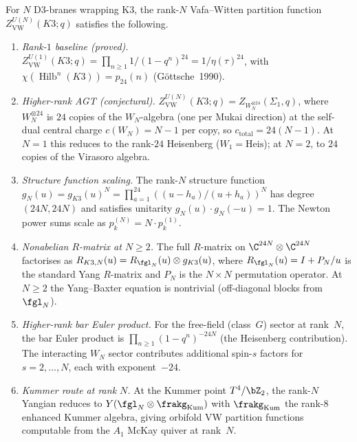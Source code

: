 \begin{conjecture}
\label{conj:k3e-agt-higher-rank}
\ClaimStatusConjectured
For $N$ D3-branes wrapping K3, the rank-$N$ Vafa--Witten partition function
$Z_{\mathrm{VW}}^{U(N)}(K3; q)$ satisfies the following.
\begin{enumerate}[label=\textup{(\alph*)}]
  \item \emph{Rank-$1$ baseline \textup{(proved)}.}
  $Z_{\mathrm{VW}}^{U(1)}(K3; q) = \prod_{n \ge 1} 1/(1 - q^n)^{24}
  = 1/\eta(\tau)^{24}$, with
  $\chi(\operatorname{Hilb}^n(K3)) = p_{24}(n)$ (G\"ottsche~1990).

  \item \emph{Higher-rank AGT \textup{(conjectural)}.}
  $Z_{\mathrm{VW}}^{U(N)}(K3; q) = Z_{W_N^{\otimes 24}}(\Sigma_1, q)$,
  where $W_N^{\otimes 24}$ is $24$ copies of the $W_N$-algebra (one per
  Mukai direction) at the self-dual central charge $c(W_N) = N - 1$
  per copy, so $c_{\mathrm{total}} = 24(N - 1)$.  At $N = 1$ this reduces
  to the rank-$24$ Heisenberg ($W_1 = \mathrm{Heis}$); at $N = 2$, to
  $24$ copies of the Virasoro algebra.

  \item \emph{Structure function scaling.}
  The rank-$N$ structure function
  $g_N(u) = g_{K3}(u)^N = \prod_{a=1}^{24}
  ((u - h_a)/(u + h_a))^N$ has degree $(24N, 24N)$
  and satisfies unitarity $g_N(u) \cdot g_N(-u) = 1$.
  The Newton power sums scale as $p_k^{(N)} = N \cdot p_k^{(1)}$.

  \item \emph{Nonabelian $R$-matrix at $N \ge 2$.}
  The full $R$-matrix on $\C^{24N} \otimes \C^{24N}$ factorises as
  $R_{K3,N}(u) = R_{\fgl_N}(u) \otimes g_{K3}(u)$,
  where $R_{\fgl_N}(u) = I + P_N/u$ is the standard Yang $R$-matrix
  and $P_N$ is the $N \times N$ permutation operator.  At $N \ge 2$
  the Yang--Baxter equation is nontrivial (off-diagonal blocks from
  $\fgl_N$).

  \item \emph{Higher-rank bar Euler product.}
  For the free-field (class~$G$) sector at rank~$N$, the bar Euler
  product is $\prod_{n \ge 1}(1 - q^n)^{-24N}$ (the Heisenberg
  contribution).  The interacting $W_N$ sector contributes additional
  spin-$s$ factors for $s = 2, \ldots, N$, each with exponent~$-24$.

  \item \emph{Kummer route at rank $N$.}
  At the Kummer point $T^4/\bZ_2$, the rank-$N$ Yangian reduces to
  $Y(\fgl_N \otimes \frakg_{\mathrm{Kum}})$ with $\frakg_{\mathrm{Kum}}$
  the rank-$8$ enhanced Kummer algebra, giving orbifold
  VW partition functions computable from the $A_1$ McKay quiver
  at rank~$N$.
\end{enumerate}


\end{conjecture}
